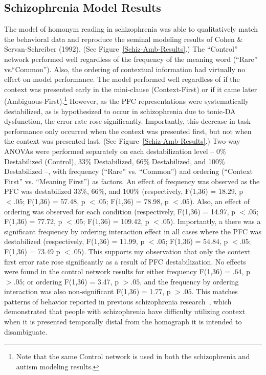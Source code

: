 \documentclass[man]{apa}
\begin{document}
\subsection{Schizophrenia Model Results}
The model of homonym reading in schizophrenia was able to qualitatively match the behavioral data and reproduce the seminal modeling results of Cohen \& Servan-Schreiber (1992). (See Figure~\ref{Schiz-Amb-Results}.)  The ``Control'' network performed well regardless of the frequency of the meaning word (``Rare'' vs.``Common'').   Also, the ordering of contextual information had virtually no effect on model performance.  The model performed well regardless of if the context was presented early in the mini-clause (Context-First) or if it came later (Ambiguous-First).\footnote{Note that the same Control network is used in both the schizophrenia and autism modeling results.}  However, as the PFC representations were systematically destabilized, as is hypothesized to occur in schizophrenia due to tonic-DA dysfunction, the error rate rose significantly. Importantly, this decrease in task performance only occurred when the context was presented first, but not when the context was presented last.  (See Figure~\ref{Schiz-Amb-Results}.)  Two-way ANOVAs were performed separately on each destabilization level -- 0\% Destabilized (Control), 33\% Destabilized, 66\% Destabilized, and 100\% Destabilized --, with frequency (``Rare'' vs. ``Common'') and ordering (``Context First'' vs. ``Meaning First'') as factors.  An effect of frequency was observed as the PFC was destabilized 33\%, 66\%, and 100\% (respectively, F(1,36) = 18.29, p $< .05$; F(1,36) = 57.48, p $< .05$; F(1,36) = 78.98, p $< .05$).  Also, an effect of ordering was observed for each condition (respectively, F(1,36) = 14.97, p $< .05$; F(1,36) = 77.72, p $< .05$; F(1,36) = 109.42, p $< .05$). Importantly, a there was a significant frequency by ordering interaction effect in all cases where the PFC was destabilized (respectively, F(1,36) = 11.99, p $< .05$; F(1,36) = 54.84, p $< .05$; F(1,36) = 73.49 p $< .05$).  This supports my observation that only the context first error rate rose significantly as a result of PFC destabilization. No effects were found in the control network results for either frequency F(1,36) = .64, p $>.05$; or ordering F(1,36) = 3.47, p $>.05$, and the frequency by ordering interaction was also non-significant F(1,36) = 1.77, p $>.05$.  This matches patterns of behavior reported in previous schizophrenia research~\cite{CohenJD:1992:Schizophrenia}, which demonstrated that people with schizophrenia have difficulty utilizing context when it is presented temporally distal from the homograph it is intended to disambiguate.    
\end{document}
